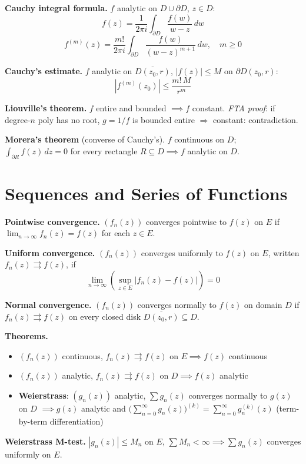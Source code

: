 \documentclass[9pt,twocolumn]{extarticle}
\begin{document}
\textbf{Cauchy integral formula.} $f$ analytic on $D\cup\partial D$, $z\in D$:
$$f(z)=\frac{1}{2\pi i}\int_{\partial D}\frac{f(w)}{w-z}\,dw$$
$$f^{(m)}(z)=\frac{m!}{2\pi i}\int_{\partial D}\frac{f(w)}{(w-z)^{m+1}}\,dw,\quad m\ge0$$

\textbf{Cauchy's estimate.} $f$ analytic on $\overline{D(z_0,r)}$, $|f(z)|\le M$ on $\partial D(z_0,r)$:
$$\left|f^{(m)}(z_0)\right|\le\frac{m!\,M}{r^m}$$

\textbf{Liouville's theorem.} $f$ entire and bounded $\implies f$ constant.\;
\textit{FTA proof}: if degree-$n$ poly has no root, $g=1/f$ is bounded entire $\Rightarrow$ constant: contradiction.

\textbf{Morera's theorem} (converse of Cauchy's). $f$ continuous on $D$;
$\int_{\partial R}f(z)\,dz=0$ for every rectangle $R\subseteq D\implies f$ analytic on $D$.

\section{Sequences and Series of Functions}

\textbf{Pointwise convergence.} $(f_n(z))$ converges pointwise to $f(z)$ on $E$ if
$\lim_{n\to\infty}f_n(z)=f(z)$ for each $z\in E$.

\textbf{Uniform convergence.} $(f_n(z))$ converges uniformly to $f(z)$ on $E$,
written $f_n(z)\rightrightarrows f(z)$, if
$$\lim_{n\to\infty}\!\left(\sup_{z\in E}|f_n(z)-f(z)|\right)=0$$

\textbf{Normal convergence.} $(f_n(z))$ converges normally to $f(z)$ on domain $D$ if
$f_n(z)\rightrightarrows f(z)$ on every closed disk $\overline{D(z_0,r)}\subseteq D$.

\textbf{Theorems.}
\begin{itemize}
  \item $(f_n(z))$ continuous, $f_n(z)\rightrightarrows f(z)$ on $E\implies f(z)$ continuous
  \item $(f_n(z))$ analytic, $f_n(z)\rightrightarrows f(z)$ on $D\implies f(z)$ analytic
  \item \textbf{Weierstrass}: $(g_n(z))$ analytic, $\sum g_n(z)$ converges normally to $g(z)$ on $D$
        $\implies g(z)$ analytic and $\bigl(\sum_{n=0}^\infty g_n(z)\bigr)^{(k)}=\sum_{n=0}^\infty g_n^{(k)}(z)$ (term-by-term differentiation)
\end{itemize}

\textbf{Weierstrass M-test.} $|g_n(z)|\le M_n$ on $E$, $\sum M_n<\infty\implies\sum g_n(z)$
converges uniformly on $E$.
\end{document}
